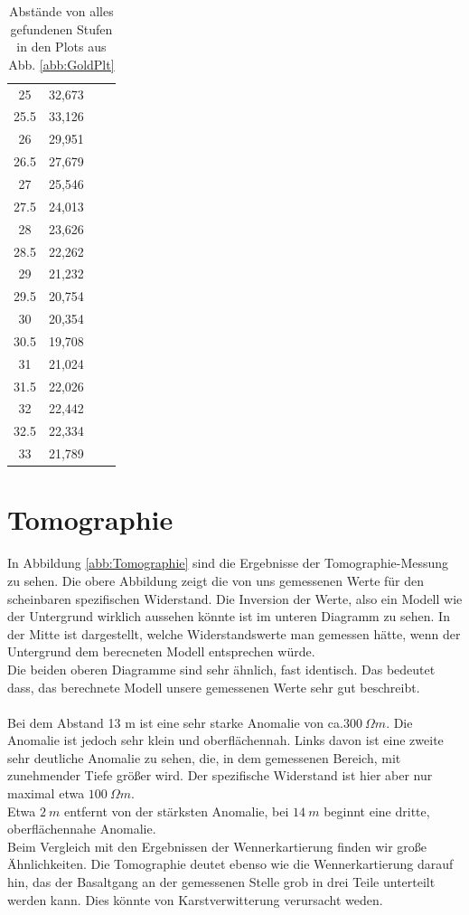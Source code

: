 \begin{table}[h]
\begin{center}
\begin{tabular}[central]{ c  c  | c  c}
25	&	32,673	\\
25.5	&	33,126	\\
26	&	29,951	\\
26.5	&	27,679	\\
27	&	25,546	\\
27.5	&	24,013	\\
28	&	23,626	\\
28.5	&	22,262	\\
29	&	21,232	\\
29.5	&	20,754	\\
30	&	20,354	\\
30.5	&	19,708	\\
31	&	21,024	\\
31.5	&	22,026	\\
32	&	22,442	\\
32.5	&	22,334	\\
33	&	21,789	\\


\end{tabular}
\caption{Abstände von alles gefundenen Stufen in den Plots aus Abb. \ref{abb:GoldPlt}}
\label{tab:wenner}
\end{center}
\end{table}


\section{Tomographie}

In Abbildung \ref{abb:Tomographie} sind die Ergebnisse der Tomographie-Messung zu sehen. Die obere Abbildung zeigt die von uns gemessenen Werte für den scheinbaren spezifischen Widerstand. Die Inversion der Werte, also ein Modell wie der Untergrund 
wirklich aussehen könnte ist im unteren Diagramm zu sehen. In der Mitte ist dargestellt, welche Widerstandswerte man gemessen hätte, wenn der Untergrund dem berecneten Modell entsprechen würde.\\
Die beiden oberen Diagramme sind sehr ähnlich, fast identisch. Das bedeutet dass, das berechnete Modell unsere gemessenen Werte sehr gut beschreibt. \\
\\
Bei dem Abstand 13 m ist eine sehr starke Anomalie von ca.$ \SI{ 300}{\Omega m}$. Die Anomalie ist jedoch sehr klein und oberflächennah. Links davon ist eine zweite sehr deutliche Anomalie zu sehen, die, in dem gemessenen Bereich,
mit zunehmender Tiefe größer wird. Der spezifische Widerstand ist hier aber nur maximal etwa $\SI{100}{\Omega m}$. \\
Etwa $\SI{2}{m}$ entfernt von der stärksten Anomalie, bei  $\SI{14}{m}$ beginnt eine dritte, oberflächennahe Anomalie. \\
Beim Vergleich mit den Ergebnissen der Wennerkartierung finden wir große Ähnlichkeiten. Die Tomographie deutet ebenso wie die Wennerkartierung darauf hin, das der Basaltgang an der gemessenen Stelle grob in drei Teile unterteilt werden kann. Dies könnte von Karstverwitterung verursacht weden.

